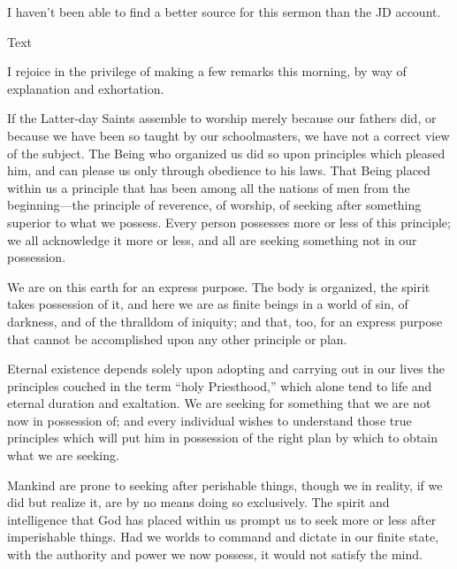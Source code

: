 					I haven't been able to find a better source for this sermon than the JD account.
				
				\begin{description}
					\item[Text]
				\end{description}
				
					I rejoice in the privilege of making a few remarks this morning, by way of explanation and exhortation.

					If the Latter-day Saints assemble to worship merely because our fathers did, or because we have been so taught by our schoolmasters, we have not a correct view of the subject. The Being who organized us did so upon principles which pleased him, and can please us only through obedience to his laws. That Being placed within us a principle that has been among all the nations of men from the beginning---the principle of reverence, of worship, of seeking after something superior to what we possess. Every person possesses more or less of this principle; we all acknowledge it more or less, and all are seeking something not in our possession.

					We are on this earth for an express purpose. The body is organized, the spirit takes possession of it, and here we are as finite beings in a world of sin, of darkness, and of the thralldom of iniquity; and that, too, for an express purpose that cannot be accomplished upon any other principle or plan.

					Eternal existence depends solely upon adopting and carrying out in our lives the principles couched in the term ``holy Priesthood,'' which alone tend to life and eternal duration and exaltation. We are seeking for something that we are not now in possession of; and every individual wishes to understand those true principles which will put him in possession of the right plan by which to obtain what we are seeking.

					Mankind are prone to seeking after perishable things, though we in reality, if we did but realize it, are by no means doing so exclusively. The spirit and intelligence that God has placed within us prompt us to seek more or less after imperishable things. Had we worlds to command and dictate in our finite state, with the authority and power we now possess, it would not satisfy the mind.

